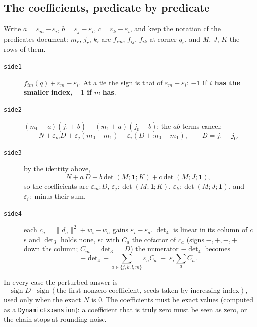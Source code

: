 \documentclass[11pt,a4paper]{article}
\newcommand{\code}[1]{\texttt{#1}}
\newcommand{\norm}[1]{\lVert #1\rVert}
\newcommand{\sgn}{\operatorname{sign}}
\theoremstyle{definition}
\theoremstyle{remark}
\begin{document}
\subsection{The coefficients, predicate by predicate}\label{ssec:coefs}

Write $a = \varepsilon_m - \varepsilon_i$, $b = \varepsilon_j - \varepsilon_i$,
$c = \varepsilon_k - \varepsilon_i$, and keep the notation of the predicates document: $m_r$,
$j_r$, $k_r$ are $f_{im}$, $f_{ij}$, $f_{ik}$ at corner $q_r$, and $M$, $J$, $K$ the rows of them.

\begin{description}
  \item[\code{side1}] $f_{im}(q) + \varepsilon_m - \varepsilon_i$. At a tie the sign is that of
    $\varepsilon_m - \varepsilon_i$: \textbf{$-1$ if $i$ has the smaller index, $+1$ if $m$ has}.
  \item[\code{side2}] $(m_0 + a)(j_1 + b) - (m_1 + a)(j_0 + b)$; the $ab$ terms cancel:
    \[
      N + \varepsilon_m D + \varepsilon_j (m_0 - m_1) - \varepsilon_i (D + m_0 - m_1),
      \qquad D = j_1 - j_0 .
    \]
  \item[\code{side3}] by the identity above,
    \[
      N + a\,D + b\det(M;\mathbf 1;K) + c\det(M;J;\mathbf 1),
    \]
    so the coefficients are $\varepsilon_m\colon D$, $\varepsilon_j\colon \det(M;\mathbf 1;K)$,
    $\varepsilon_k\colon \det(M;J;\mathbf 1)$, and $\varepsilon_i\colon$ minus their sum.
  \item[\code{side4}] each $c_a = \norm{d_a}^2 + w_i - w_a$ gains $\varepsilon_i - \varepsilon_a$.
    $\det\nolimits_4$ is linear in its column of $c$s and $\det\nolimits_3$ holds none, so with $C_a$ the cofactor
    of $c_a$ (signs $-,+,-,+$ down the column; $C_m = \det\nolimits_3 = D$) the numerator $-\det\nolimits_4$ becomes
    \[
      -\det\nolimits_4 + \sum_{a\in\{j,k,l,m\}} \varepsilon_a C_a \;-\; \varepsilon_i \sum_a C_a .
    \]
\end{description}
In every case the perturbed answer is
\[
  \sgn D \cdot \sgn(\text{the first nonzero coefficient, seeds taken by increasing index}),
\]
used only when the exact $N$ is 0. The coefficients must be exact values (computed as a
\code{DynamicExpansion}): a coefficient that is truly zero must be seen as zero, or the chain
stops at rounding noise.
\end{document}
